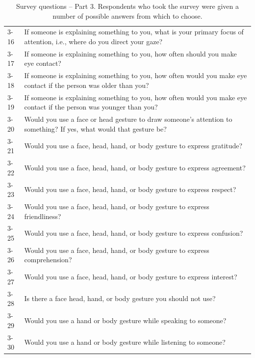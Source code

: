 \documentclass{CSSRforAfrica}
\begin{document}
\begin{table}[H]
\begin{center}
\begin{tabularx}{\linewidth}{|l |X|}
 {\small 3-16}   & {\small If someone is explaining something to you, what is your primary focus of attention, i.e., where do you direct your gaze?}\\
 {\small 3-17}  & {\small If someone is explaining something to  you,  how often should you make eye contact?}\\
 {\small 3-18}   & {\small If someone is explaining something to  you,  how often would you make eye contact if the person was older than you?}\\
 {\small 3-19}    & {\small If someone is explaining something to you,  how often would you make eye contact if the person was younger than you?}\\	
 {\small 3-20}   & {\small Would you use a face or head gesture to draw someone's attention  to something? If yes, what would that gesture be? }\\
 {\small 3-21}    & {\small Would you use a face, head, hand, or body gesture to express gratitude?}\\
 {\small 3-22 }  & {\small Would you use a face,  head, hand, or body gesture to express agreement?}\\
 {\small 3-23 }    & {\small Would you use a face,  head, hand, or body gesture to express  respect?}\\
 {\small 3-24 }   & {\small Would you use a face,  head, hand, or body gesture to express friendliness?}\\
 {\small 3-25 }    & {\small Would you use a face,  head, hand, or body gesture to express  confusion?}\\
 {\small 3-26 }   & {\small Would you use a face,  head, hand, or body gesture to express comprehension? }\\
 {\small 3-27 }  & {\small Would you use a face,  head, hand, or body gesture to express interest?}\\
 {\small 3-28 }   & {\small Is there  a face head, hand, or body gesture you should not use?}\\
 {\small 3-29 }  & {\small Would you use a hand or body gesture while speaking to someone? }\\
 {\small 3-30 }   & {\small Would you use a hand or body gesture while listening to someone?}\\
\hline \hline
\end{tabularx}
\end{center}
\caption{Survey questions -- Part 3. Respondents who took the survey were given a number of possible answers from which to choose. }
\label{table:questions3}
\end{table}
\end{document}
